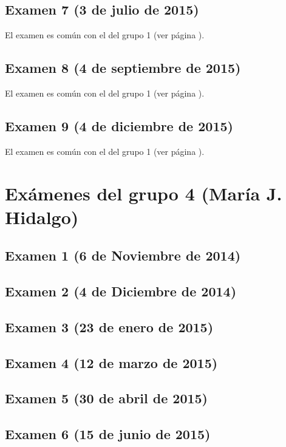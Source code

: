 \documentclass[a4paper,12pt,twoside]{book}
\begin{document}
\subsection{Examen 7 (3 de julio de 2015)}
El examen es común con el del grupo 1 (ver página \pageref{examen_14_15_5_7}).
\subsection{Examen 8 (4 de septiembre de 2015)}
El examen es común con el del grupo 1 (ver página \pageref{examen_14_15_5_8}).
\subsection{Examen 9 (4 de diciembre de 2015)}
El examen es común con el del grupo 1 (ver página \pageref{examen_14_15_5_9}).

\section{Exámenes del grupo 4 (María J. Hidalgo)}
\subsection{Examen 1 (6 de Noviembre de 2014)}
\subsection{Examen 2 (4 de Diciembre de 2014)}
\subsection{Examen 3 (23 de enero de 2015)}
 \label{examen_14_15_4_3}
\subsection{Examen 4 (12 de marzo de 2015)}
\subsection{Examen 5 (30 de abril de 2015)}
\subsection{Examen 6 (15 de junio de 2015)}
 \label{examen_14_15_4_6}
\end{document}
